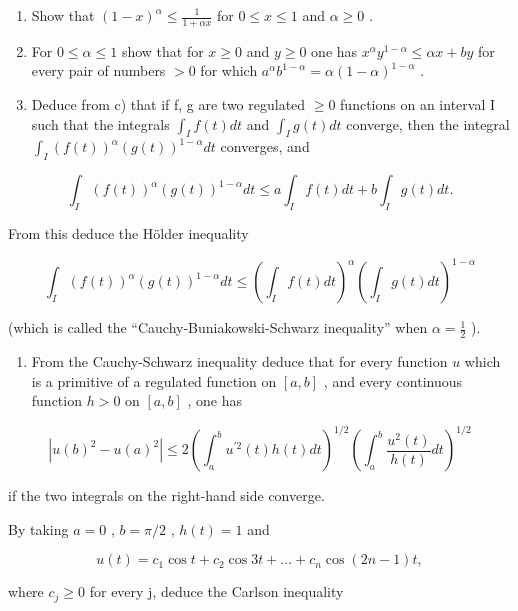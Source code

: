 \begin{enumerate}
\def\labelenumi{\alph{enumi})}
\setcounter{enumi}{1}
\item
  Show that \((1 - x)^{\alpha} \leqslant \frac{1}{1 + \alpha x}\) for \(0 \leqslant x \leqslant 1\) and \(\alpha \geqslant 0\) .
\item
  For \(0 \leqslant \alpha \leqslant 1\) show that for \(x \geqslant 0\) and \(y \geqslant 0\) one has \(x^{\alpha} y^{1 - \alpha} \leqslant \alpha x + by\) for every pair of numbers \(>0\) for which \(a^{\alpha} b^{1 - \alpha} = \alpha (1 - \alpha)^{1 - \alpha}\) .
\item
  Deduce from c) that if f, g are two regulated \(\geqslant 0\) functions on an interval I such that the integrals \(\int_{I} f(t) dt\) and \(\int_{I} g(t) dt\) converge, then the integral \(\int_{I} (f(t))^{\alpha}(g(t))^{1-\alpha} dt\) converges, and
\end{enumerate}

\[
\int_ {I} (f (t)) ^ {\alpha} (g (t)) ^ {1 - \alpha} d t \leqslant a \int_ {I} f (t) d t + b \int_ {I} g (t) d t.
\]

From this deduce the Hölder inequality

\[
\int_ {I} (f (t)) ^ {\alpha} (g (t)) ^ {1 - \alpha} d t \leqslant \left(\int_ {I} f (t) d t\right) ^ {\alpha} \left(\int_ {I} g (t) d t\right) ^ {1 - \alpha}
\]

(which is called the ``Cauchy-Buniakowski-Schwarz inequality'' when \(\alpha = \frac{1}{2}\) ).

\begin{enumerate}
\def\labelenumi{\arabic{enumi})}
\setcounter{enumi}{3}
\tightlist
\item
  From the Cauchy-Schwarz inequality deduce that for every function \(u\) which is a primitive of a regulated function on \([a, b]\) , and every continuous function \(h > 0\) on \([a, b]\) , one has
\end{enumerate}

\[
\left| u (b) ^ {2} - u (a) ^ {2} \right| \leqslant 2 \left(\int_ {a} ^ {b} u ^ {\prime 2} (t) h (t) d t\right) ^ {1 / 2} \left(\int_ {a} ^ {b} \frac {u ^ {2} (t)}{h (t)} d t\right) ^ {1 / 2}
\]

if the two integrals on the right-hand side converge.

By taking \(a = 0\) , \(b = \pi / 2\) , \(h(t) = 1\) and

\[
u (t) = c _ {1} \cos t + c _ {2} \cos 3 t + \dots + c _ {n} \cos (2 n - 1) t,
\]

where \(c_{j} \geqslant 0\) for every j, deduce the Carlson inequality

